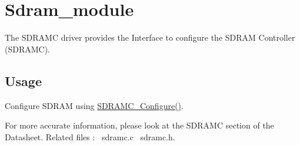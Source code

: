 \hypertarget{group__sdram__module}{}\section{Sdram\+\_\+module}
\label{group__sdram__module}
The S\+D\+R\+A\+MC driver provides the Interface to configure the S\+D\+R\+AM Controller (S\+D\+R\+A\+MC). \hypertarget{group__RTEMSBSPsARM_Usage}{}\subsection{Usage}\label{group__RTEMSBSPsARM_Usage}

\begin{DoxyItemize}
\item Configure S\+D\+R\+AM using \mbox{\hyperlink{sdramc_8c_acba42d34b53227828bbecdd7c642e00a}{S\+D\+R\+A\+M\+C\+\_\+\+Configure()}}.


\end{DoxyItemize}For more accurate information, please look at the S\+D\+R\+A\+MC section of the Datasheet. Related files \+:~\newline
sdramc.\+c~\newline
 sdramc.\+h.~\newline
 